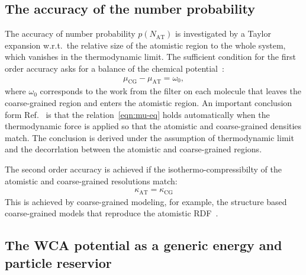 \documentclass[epjST]{svjour}
\newcommand{\AT}[0]{\textrm{AT}}
\newcommand{\CG}[0]{\textrm{CG}}
\begin{document}
\subsection{The accuracy of the number probability}

The accuracy of number probability $p(N_\AT)$ is investigated by a
Taylor expansion w.r.t.~the relative size of the atomistic region to
the whole system, which vanishes in the thermodynamic limit. The sufficient condition for the first order accuracy
asks for a balance of the chemical potential~\cite{wang2013grand}:
\begin{align}\label{eqn:mu-eq}
  \mu_\CG - \mu_\AT = \omega_0,
\end{align}
where $\omega_0$ corresponds to the work from the filter on each
molecule that leaves the coarse-grained region and  enters the atomistic region. An important conclusion
form Ref.~\cite{wang2013grand} is that the relation~\eqref{eqn:mu-eq}
holds automatically when the thermodynamic force is applied so that the atomistic
and coarse-grained densities match. The conclusion is derived under
the assumption of thermodynamic limit and the decorrlation between the
atomistic and coarse-grained regions.

The second order accuracy is achieved if the isothermo-compressibilty of the atomistic and coarse-grained resolutions match:
\begin{align}
  \kappa_\AT = \kappa_\CG
\end{align}
This is achieved by coarse-grained modeling, for example, the
structure based coarse-grained models that reproduce the atomistic
RDF~\cite{wang2009comparative}.

\subsection{The WCA potential as a generic energy and particle reservior}
\end{document}
